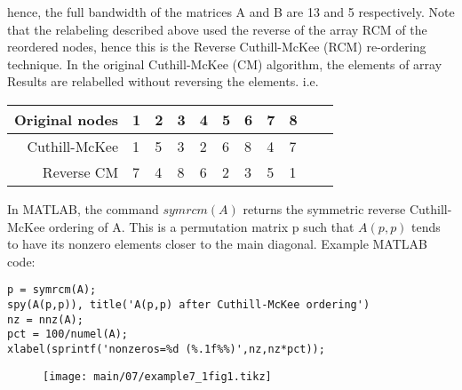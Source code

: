 hence, the full bandwidth of the matrices A and B are 13 and 5 respectively.
\vskip 12pt
\noindent
Note that the relabeling described above used the reverse of the array RCM of
the reordered nodes, hence this is the Reverse Cuthill-McKee (RCM) re-ordering
technique.  In the original Cuthill-McKee (CM) algorithm, the elements of array
Results are relabelled without reversing the elements. i.e.
\vskip 10pt
\noindent
\begin{center}
    \begin{tabular}{ r | l l l l l l l l l l }
    Original nodes  & 1 & 2 & 3 & 4 & 5 & 6 & 7 & 8 \\
    \hline
    Cuthill-McKee   & 1 & 5 & 3 & 2 & 6 & 8 & 4 & 7 \\
    Reverse CM      & 7 & 4 & 8 & 6 & 2 & 3 & 5 & 1 \\
    \end{tabular}
\end{center}
\noindent
\vskip 10pt

\noindent
In MATLAB, the command $symrcm(A)$ returns the symmetric reverse Cuthill-McKee
ordering of A. This is a permutation matrix p such that $A(p,p)$ tends to have
its nonzero elements closer to the main diagonal.
\vskip 6pt
\noindent
Example MATLAB code:
\noindent
\begin{lstlisting}
p = symrcm(A);
spy(A(p,p)), title('A(p,p) after Cuthill-McKee ordering')
nz = nnz(A);
pct = 100/numel(A);
xlabel(sprintf('nonzeros=%d (%.1f%%)',nz,nz*pct));
\end{lstlisting}

\begin{figure}[H]
  \begin{center}
      \scriptsize\texttt{[image: main/07/example7\_1fig1.tikz]}
  \end{center}
\end{figure}

